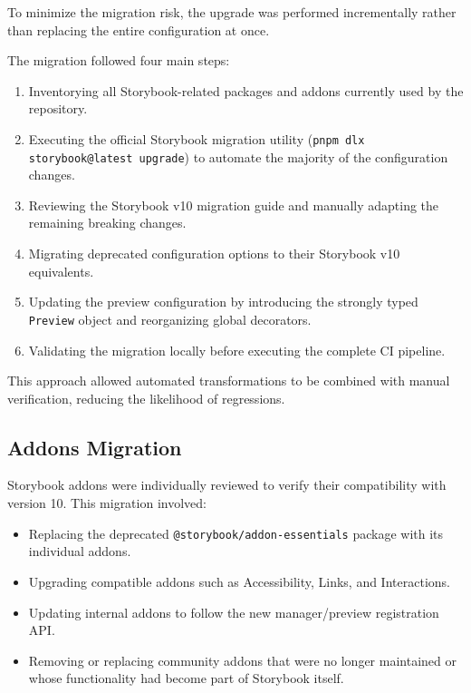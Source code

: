 To minimize the migration risk, the upgrade was performed incrementally rather than replacing the entire configuration at once.

The migration followed four main steps:

\begin{enumerate}
    \item Inventorying all Storybook-related packages and addons currently used by the repository.
    \item Executing the official Storybook migration utility (\lstinline|pnpm dlx storybook@latest upgrade|) to automate the majority of the configuration changes.
    \item Reviewing the Storybook v10 migration guide and manually adapting the remaining breaking changes.
    \item Migrating deprecated configuration options to their Storybook v10 equivalents.
    \item Updating the preview configuration by introducing the strongly typed \lstinline|Preview| object and reorganizing global decorators.
    \item Validating the migration locally before executing the complete CI pipeline.
\end{enumerate}

This approach allowed automated transformations to be combined with manual verification, reducing the likelihood of regressions.

\subsection{Addons Migration}

Storybook addons were individually reviewed to verify their compatibility with version 10. This migration involved:

\begin{itemize}
    \item Replacing the deprecated \lstinline|@storybook/addon-essentials| package with its individual addons.
    \item Upgrading compatible addons such as Accessibility, Links, and Interactions.
    \item Updating internal addons to follow the new manager/preview registration API.
    \item Removing or replacing community addons that were no longer maintained or whose functionality had become part of Storybook itself.
\end{itemize}

